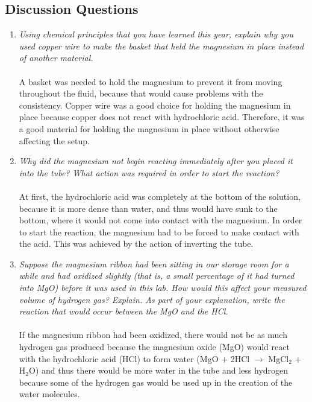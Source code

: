 \documentclass[11pt]{article}
\begin{document}
\subsection{Discussion Questions}
\begin{enumerate}
	\item \textit{Using chemical principles that you have learned this year, explain why you used copper wire to make the 
basket that held the magnesium in place instead of another material.} \\ \\ A basket was needed to hold the magnesium to prevent it from moving throughout the fluid, because that would cause problems with the consistency. Copper wire was a good choice for holding the magnesium in place because copper does not react with hydrochloric acid. Therefore, it was a good material for holding the magnesium in place without otherwise affecting the setup. \\
	\item  \textit{ Why did the magnesium not begin reacting immediately after you placed it into the tube? What action was 
required in order to start the reaction? } \\ \\ At first, the hydrochloric acid was completely at the bottom of the solution, because it is more dense than water, and thus would have sunk to the bottom, where it would not come into contact with the magnesium. In order to start the reaction, the magnesium had to be forced to make contact with the acid. This was achieved by the action of inverting the tube.\\ 
	\item \textit{Suppose the magnesium ribbon had been sitting in our storage room for a while and had oxidized slightly 
(that is, a small percentage of it had turned into MgO) before it was used in this lab. How would this affect 
your measured volume of hydrogen gas? Explain. As part of your explanation, write the reaction that would 
occur between the MgO and the HCl.}\\ \\ If the magnesium ribbon had been oxidized, there would not be as much hydrogen gas produced because the magnesium oxide (MgO) would react with the hydrochloric acid (HCl) to form water (MgO + 2HCl $\rightarrow$ MgCl$_{2}$ + H$_{2}$O) and thus there would be more water in the tube and less hydrogen because some of the hydrogen gas would be used up in the creation of the water molecules. \\ 


\end{enumerate}
\end{document}

